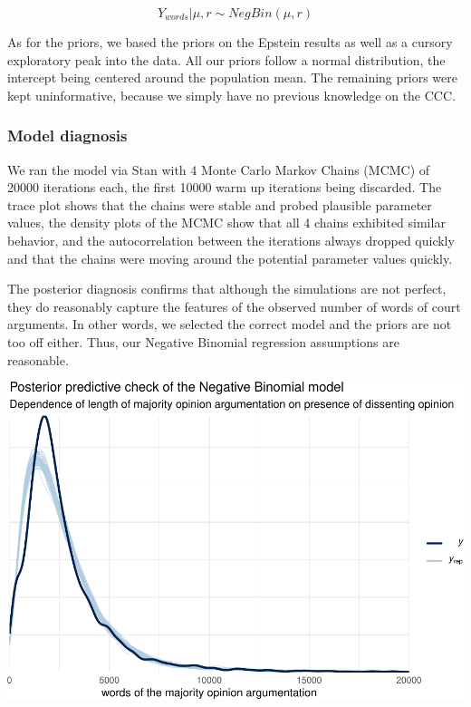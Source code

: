 \documentclass[
  11pt,
]{article}
\begin{document}
\[
Y_{words} | \mu, r \sim NegBin(\mu, r)
\]

As for the priors, we based the priors on the Epstein results as well as
a cursory exploratory peak into the data. All our priors follow a normal
distribution, the intercept being centered around the population mean.
The remaining priors were kept uninformative, because we simply have no
previous knowledge on the CCC.

\hypertarget{model-diagnosis}{%
\subsubsection{Model diagnosis}\label{model-diagnosis}}

We ran the model via Stan with 4 Monte Carlo Markov Chains (MCMC) of
20000 iterations each, the first 10000 warm up iterations being
discarded. The trace plot shows that the chains were stable and probed
plausible parameter values, the density plots of the MCMC show that all
4 chains exhibited similar behavior, and the autocorrelation between the
iterations always dropped quickly and that the chains were moving around
the potential parameter values quickly.

The posterior diagnosis confirms that although the simulations are not
perfect, they do reasonably capture the features of the observed number
of words of court arguments. In other words, we selected the correct
model and the priors are not too off either. Thus, our Negative Binomial
regression assumptions are reasonable.

\includegraphics{dissents_article_appendix_files/figure-latex/pp_check_negbinom-1.pdf}
\end{document}
